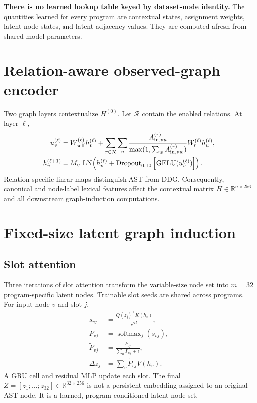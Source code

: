 \documentclass[11pt,a4paper]{article}
\newcommand{\R}{\mathbb{R}}
\newcommand{\softmax}{\operatorname{softmax}}
\newcommand{\LN}{\operatorname{LN}}
\newcommand{\GELU}{\operatorname{GELU}}
\begin{document}
\textbf{There is no learned lookup table keyed by dataset-node identity.}
The quantities learned for every program are contextual states, assignment
weights, latent-node states, and latent adjacency values. They are computed
afresh from shared model parameters.

\section{Relation-aware observed-graph encoder}

Two graph layers contextualize $H^{(0)}$. Let $\mathcal R$ contain the enabled
relations. At layer $\ell$,
\begin{align}
u_v^{(\ell)}
&=W_{\rm self}^{(\ell)}h_v^{(\ell)}
+\sum_{r\in\mathcal R}\sum_u
\frac{A_{{\rm in},vu}^{(r)}}
{\max(1,\sum_w A_{{\rm in},vw}^{(r)})}
W_r^{(\ell)}h_u^{(\ell)},\\
h_v^{(\ell+1)}
&=M_v\,\LN\!\left(
h_v^{(\ell)}
+\operatorname{Dropout}_{0.10}
\left[\GELU(u_v^{(\ell)})\right]\right).
\end{align}
Relation-specific linear maps distinguish AST from DDG. Consequently, canonical
and node-label lexical features affect the contextual matrix
$H\in\R^{n\times256}$ and all downstream graph-induction computations.

\section{Fixed-size latent graph induction}

\subsection{Slot attention}

Three iterations of slot attention transform the variable-size node set into
$m=32$ program-specific latent nodes. Trainable slot seeds are shared across
programs. For input node $v$ and slot $j$,
\begin{align}
s_{vj}&=\frac{Q(z_j)^\top K(h_v)}{\sqrt d},\\
P_{vj}&=\softmax_j(s_{vj}),\\
\widetilde P_{vj}
&=\frac{P_{vj}}{\sum_uP_{uj}+\epsilon},\\
\Delta z_j&=\sum_v\widetilde P_{vj}V(h_v).
\end{align}
A GRU cell and residual MLP update each slot. The final
$Z=[z_1;\ldots;z_{32}]\in\R^{32\times256}$ is not a persistent embedding assigned
to an original AST node. It is a learned, program-conditioned latent-node set.
\end{document}
